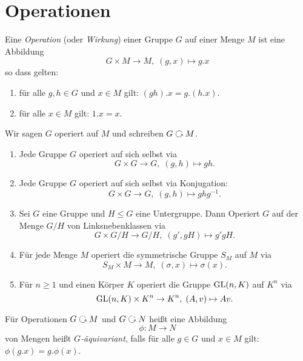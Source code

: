 \documentclass{book}
\begin{document}
\section{Operationen}%
\label{sec:operationen}

\begin{defi}
    \label{defi:operation}
    Eine \emph{Operation} (oder \emph{Wirkung}) einer Gruppe $G$ auf einer Menge $M$ ist eine Abbildung 
    \[
        G \times M \to M,\; (g,x) \mapsto g.x 
    \]
    so dass gelten:
    \begin{enumerate}
        \item für alle $g, h \in G$ und $x \in M$ gilt: $(gh).x = g.(h.x)$.
        \item für alle $x \in M$ gilt: $1.x = x$. 
    \end{enumerate}
    Wir sagen $G$ operiert auf $M$ und schreiben $G \actson M$. 
\end{defi}

\begin{exas}
    \label{exas:groupops}
    \begin{enumerate}
        \item Jede Gruppe $G$ operiert auf sich selbst via
            \[
                G \times G \to G, \; (g,h) \mapsto gh.
            \]
        \item {}Jede Gruppe $G$ operiert auf sich selbst via Konjugation:
            \[
                G \times G \to G, \; (g,h) \mapsto ghg^{-1}.
            \]
        \item {}Sei $G$ eine Gruppe und $H \le G$ eine Untergruppe. Dann Operiert
            $G$ auf der Menge $G/H$ von Linksnebenklassen via
            \[
                G \times G/H \to G/H, \; (g', gH) \mapsto g'gH.
            \]
        \item {}Für jede Menge $M$ operiert die symmetrische Gruppe $S_M$ auf $M$ via
            \[
                S_M \times M \to M,\; (\sigma,x) \mapsto \sigma(x).
            \]
        \item Für $n \ge 1$ und einen Körper $K$ operiert die Gruppe $\operatorname{GL}(n,K)$ auf $K^n$ via
            \[
                \operatorname{GL}(n,K) \times K^n \to K^n,\; (A,v) \mapsto Av.
            \]
    \end{enumerate}
\end{exas}

\begin{defi}
    \label{defi:gehom}
    Für Operationen $G \actson M$ und $G \actson N$ heißt eine Abbildung
    \[
        \phi: M \to N
    \]
    von Mengen heißt \emph{$G$-äquivariant}, falls für alle $g \in G$ und $x
    \in M$ gilt: $\phi(g.x) = g. \phi(x)$. 
\end{defi}
\end{document}
